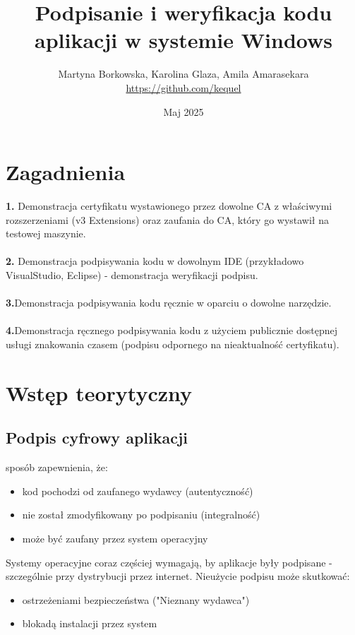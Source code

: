 \documentclass{article}
\title{Podpisanie i weryfikacja kodu aplikacji w systemie Windows}
\author{Martyna Borkowska, Karolina Glaza, Amila Amarasekara \\ \url{https://github.com/kequel}}
\date{Maj 2025}
\begin{document}
\maketitle

\section*{Zagadnienia}
\textbf{1.} Demonstracja certyfikatu wystawionego przez dowolne CA z właściwymi rozszerzeniami (v3 Extensions) oraz zaufania do CA, który go wystawił na testowej maszynie. \\ \\
\textbf{2.} Demonstracja podpisywania kodu w dowolnym IDE (przykładowo VisualStudio, Eclipse) - demonstracja weryfikacji podpisu. \\ \\
\textbf{3.}Demonstracja podpisywania kodu ręcznie w oparciu o dowolne narzędzie.\\ \\
\textbf{4.}Demonstracja ręcznego podpisywania kodu z użyciem publicznie dostępnej usługi znakowania czasem (podpisu odpornego na nieaktualność certyfikatu). \\



\section*{Wstęp teorytyczny}
\subsection*{Podpis cyfrowy aplikacji}
sposób zapewnienia, że:
\begin{itemize}
    \item kod pochodzi od zaufanego wydawcy (autentyczność)
    \item nie został zmodyfikowany po podpisaniu (integralność)
    \item może być zaufany przez system operacyjny 
\end{itemize}
Systemy operacyjne coraz częściej wymagają, by aplikacje były podpisane - szczególnie przy dystrybucji przez internet. Nieużycie podpisu może skutkować:
\begin{itemize}
    \item ostrzeżeniami bezpieczeństwa ("Nieznany wydawca")
    \item blokadą instalacji przez system
\end{itemize}
\end{document}
